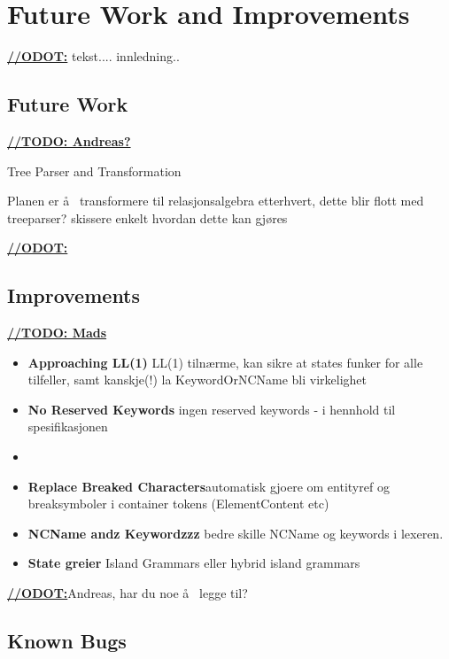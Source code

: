 \chapter{Future Work and Improvements}
\label{sect:summary:future_work}
\underline{\textbf{\LARGE //ODOT:}} tekst.... innledning..


\section{Future Work}
\underline{\textbf{\LARGE //TODO: Andreas?}}

Tree Parser and Transformation

Planen er \aa~ transformere til relasjonsalgebra etterhvert, dette blir flott med treeparser? skissere enkelt hvordan dette kan gj\o res

\underline{\textbf{\LARGE //ODOT:}}

\section{Improvements}
\underline{\textbf{\LARGE //TODO: Mads}} 

\begin{itemize}
\item \textbf{Approaching LL(1)} LL(1) tiln\ae rme, kan sikre at states funker for alle tilfeller, samt kanskje(!) la KeywordOrNCName bli virkelighet

\item \textbf{No Reserved Keywords}  ingen reserved keywords - i hennhold til spesifikasjonen

\item

\item \textbf{Replace Breaked Characters}automatisk gjoere om entityref og breaksymboler i container tokens (ElementContent etc)

\item \textbf{NCName andz Keywordzzz} bedre skille NCName og keywords i lexeren.

\item \textbf{State greier} Island Grammars eller hybrid island grammars

\end{itemize}

\underline{\textbf{\LARGE //ODOT:}}Andreas, har du noe \aa~ legge til?

\section{Known Bugs}
\label{sect:future:knownBugs}

